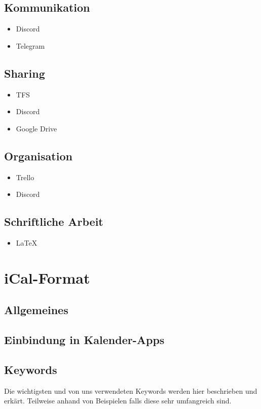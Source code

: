 \documentclass[11pt]{scrartcl}
\begin{document}
\subsection{Kommunikation}
\begin{itemize}
\item Discord
\item Telegram
\end{itemize}
\subsection{Sharing}
\begin{itemize}
\item TFS
\item Discord
\item Google Drive
\end{itemize}
\subsection{Organisation}
\begin{itemize}
\item Trello
\item Discord
\end{itemize}
\subsection{Schriftliche Arbeit}
\begin{itemize}
\item LaTeX
\end{itemize}


\section{iCal-Format}
\label{sec:ical-format}
\subsection{Allgemeines}
\label{sec:ical-allgemeines}
\subsection{Einbindung in Kalender-Apps}
\label{sec:ical-einbindung-in-kalenderapps}
\subsection{Keywords}
\label{sec:ical-keywords}
Die wichtigsten und von uns verwendeten Keywords werden hier beschrieben und erkärt. Teilweise anhand von Beispielen falls diese sehr umfangreich sind. 
\end{document}
